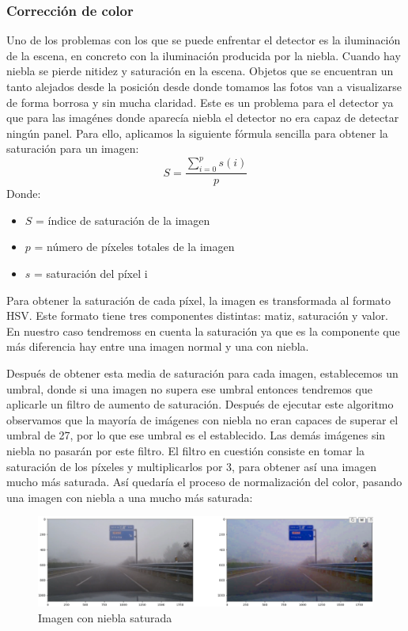 \documentclass[a4paper, 12pt]{article}
\begin{document}
\subsubsection{Corrección de color}
Uno de los problemas con los que se puede enfrentar el detector es la iluminación de la escena, en concreto con la iluminación producida por la niebla. Cuando hay niebla se pierde nitidez y saturación en la escena. Objetos que se encuentran un tanto alejados desde la posición desde donde tomamos las fotos van a visualizarse de forma borrosa y sin mucha claridad. Este es un problema para el detector ya que para las imagénes donde aparecía niebla el detector no era capaz de detectar ningún panel.
Para ello, aplicamos la siguiente fórmula sencilla para obtener la saturación para un imagen:
	\begin{equation}
		S = \frac{\sum_{i=0}^p s(i)}{p}
	\end{equation}
Donde:
\begin{itemize}
    \item $S$ = índice de saturación de la imagen
    \item $p$ = número de píxeles totales de la imagen
    \item $s$ = saturación del píxel i
\end{itemize}
Para obtener la saturación de cada píxel, la imagen es transformada al formato HSV. Este formato tiene tres componentes distintas: matiz, saturación y valor. En nuestro caso tendremoss en cuenta la saturación ya que es la componente que más diferencia hay entre una imagen normal y una con niebla.

Después de obtener esta media de saturación para cada imagen, establecemos un umbral, donde si una imagen no supera ese umbral entonces tendremos que aplicarle un filtro de aumento de saturación. Después de ejecutar este algoritmo observamos que la mayoría de imágenes con niebla no eran capaces de superar el umbral de 27, por lo que ese umbral es el establecido. Las demás imágenes sin niebla no pasarán por este filtro. El filtro en cuestión consiste en tomar la saturación de los píxeles y multiplicarlos por 3, para obtener así una imagen mucho más saturada. Así quedaría el proceso de normalización del color, pasando una imagen con niebla a una mucho más saturada:
\begin{figure}[h]
	\centering
	\includegraphics[width=0.8\linewidth]{img/saturated_img.png}
	\caption{Imagen con niebla saturada}
	\label{fig:saturada}
\end{figure}
\end{document}
